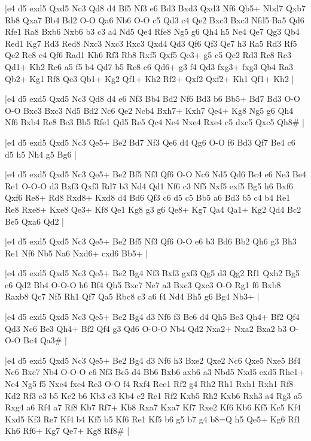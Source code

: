 \whitename{}
\blackname{}
\makegametitle
|e4 d5 exd5 Qxd5 Nc3 Qd8 d4 Bf5 Nf3 e6 Bd3 Bxd3 Qxd3 Nf6 Qb5+ Nbd7 Qxb7 Rb8 Qxa7 Bb4 Bd2 O-O Qa6 Nb6 O-O c5 Qd3 c4 Qe2 Bxc3 Bxc3 Nfd5 Ba5 Qd6 Rfe1 Ra8 Bxb6 Nxb6 b3 c3 a4 Nd5 Qe4 Rfe8 Ng5 g6 Qh4 h5 Ne4 Qe7 Qg3 Qb4 Red1 Kg7 Rd3 Red8 Nxc3 Nxc3 Rxc3 Qxd4 Qd3 Qf6 Qf3 Qe7 h3 Ra5 Rd3 Rf5 Qe2 Rc8 c4 Qf6 Rad1 Kh6 Rf3 Rb8 Rxf5 Qxf5 Qe3+ g5 c5 Qc2 Rd3 Rc8 Rc3 Qd1+ Kh2 Rc6 a5 f5 b4 Qd7 b5 Rc8 c6 Qd6+ g3 f4 Qd3 fxg3+ fxg3 Qb4 Ra3 Qb2+ Kg1 Rf8 Qe3 Qb1+ Kg2 Qf1+ Kh2 Rf2+ Qxf2 Qxf2+ Kh1 Qf1+ Kh2  |

\whitename{}
\blackname{}
\makegametitle
|e4 d5 exd5 Qxd5 Nc3 Qd8 d4 e6 Nf3 Bb4 Bd2 Nf6 Bd3 b6 Bb5+ Bd7 Bd3 O-O O-O Bxc3 Bxc3 Nd5 Bd2 Nc6 Qe2 Ncb4 Bxh7+ Kxh7 Qe4+ Kg8 Ng5 g6 Qh4 Nf6 Bxb4 Re8 Bc3 Bb5 Rfe1 Qd5 Re5 Qc4 Ne4 Nxe4 Rxe4 c5 dxc5 Qxc5 Qh8\#  |

\whitename{}
\blackname{}
\makegametitle
|e4 d5 exd5 Qxd5 Nc3 Qe5+ Be2 Bd7 Nf3 Qe6 d4 Qg6 O-O f6 Bd3 Qf7 Be4 c6 d5 h5 Nh4 g5 Bg6  |

\whitename{}
\blackname{}
\makegametitle
|e4 d5 exd5 Qxd5 Nc3 Qe5+ Be2 Bf5 Nf3 Qf6 O-O Nc6 Nd5 Qd6 Bc4 e6 Ne3 Be4 Re1 O-O-O d3 Bxf3 Qxf3 Rd7 b3 Nd4 Qd1 Nf6 c3 Nf5 Nxf5 exf5 Bg5 h6 Bxf6 Qxf6 Re8+ Rd8 Rxd8+ Kxd8 d4 Bd6 Qf3 c6 d5 c5 Bb5 a6 Bd3 b5 c4 b4 Re1 Re8 Rxe8+ Kxe8 Qe3+ Kf8 Qe1 Kg8 g3 g6 Qe8+ Kg7 Qa4 Qa1+ Kg2 Qd4 Bc2 Be5 Qxa6 Qd2  |

\whitename{}
\blackname{}
\makegametitle
|e4 d5 exd5 Qxd5 Nc3 Qe5+ Be2 Bf5 Nf3 Qf6 O-O e6 b3 Bd6 Bb2 Qh6 g3 Bh3 Re1 Nf6 Nb5 Na6 Nxd6+ cxd6 Bb5+  |

\whitename{}
\blackname{}
\makegametitle
|e4 d5 exd5 Qxd5 Nc3 Qe5+ Be2 Bg4 Nf3 Bxf3 gxf3 Qg5 d3 Qg2 Rf1 Qxh2 Bg5 e6 Qd2 Bb4 O-O-O h6 Bf4 Qh5 Bxc7 Ne7 a3 Bxc3 Qxc3 O-O Rg1 f6 Bxb8 Raxb8 Qc7 Nf5 Rh1 Qf7 Qa5 Rbc8 c3 a6 f4 Nd4 Bh5 g6 Bg4 Nb3+  |

\whitename{}
\blackname{}
\makegametitle
|e4 d5 exd5 Qxd5 Nc3 Qe5+ Be2 Bg4 d3 Nf6 f3 Be6 d4 Qh5 Be3 Qh4+ Bf2 Qf4 Qd3 Nc6 Be3 Qh4+ Bf2 Qf4 g3 Qd6 O-O-O Nb4 Qd2 Nxa2+ Nxa2 Bxa2 b3 O-O-O Bc4 Qa3\#  |

\whitename{}
\blackname{}
\makegametitle
|e4 d5 exd5 Qxd5 Nc3 Qe5+ Be2 Bg4 d3 Nf6 h3 Bxe2 Qxe2 Nc6 Qxe5 Nxe5 Bf4 Nc6 Bxc7 Nb4 O-O-O e6 Nf3 Bc5 d4 Bb6 Bxb6 axb6 a3 Nbd5 Nxd5 exd5 Rhe1+ Ne4 Ng5 f5 Nxe4 fxe4 Re3 O-O f4 Rxf4 Ree1 Rf2 g4 Rh2 Rh1 Rxh1 Rxh1 Rf8 Kd2 Rf3 c3 b5 Kc2 b6 Kb3 e3 Kb4 e2 Re1 Rf2 Kxb5 Rh2 Kxb6 Rxh3 a4 Rg3 a5 Rxg4 a6 Rf4 a7 Rf8 Kb7 Rf7+ Kb8 Rxa7 Kxa7 Kf7 Rxe2 Kf6 Kb6 Kf5 Kc5 Kf4 Kxd5 Kf3 Re7 Kf4 b4 Kf5 b5 Kf6 Re1 Kf5 b6 g5 b7 g4 b8=Q h5 Qe5+ Kg6 Rf1 Kh6 Rf6+ Kg7 Qe7+ Kg8 Rf8\#  |

